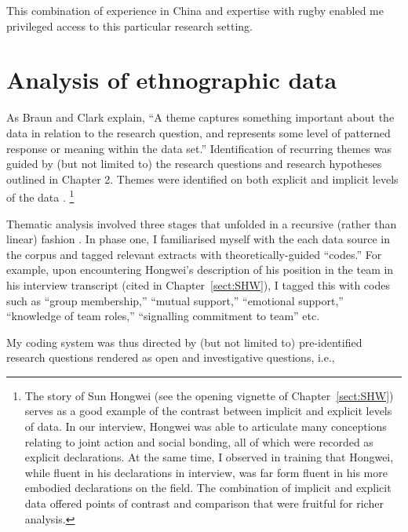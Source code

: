 \begin{CJK}{UTF8}{gbsn}
  This combination of experience in China and expertise with rugby enabled me privileged access to this particular research setting.



\section{Analysis of ethnographic data\label{app3:ethnoAnalysis}}
As Braun and Clark \textcite[10]{Braun2006} explain, ``A theme captures something important about the data in relation to the research question, and represents some level of patterned response or meaning within the data set.''  Identification of recurring themes was guided by (but not limited to) the research questions and research hypotheses outlined in Chapter 2.  Themes were identified on both explicit and implicit levels of the data \citep{Boyatzis1998}.  \footnote{The story of Sun Hongwei (see the opening vignette of Chapter~\ref{sect:SHW}) serves as a good example of the contrast between implicit and explicit levels of data.  In our interview, Hongwei was able to articulate many conceptions relating to joint action and social bonding, all of which were recorded as explicit declarations.  At the same time, I observed in training that Hongwei, while fluent in his declarations in interview, was far form fluent in his more embodied declarations on the field.  The combination of implicit and explicit data offered points of contrast and comparison that were fruitful for richer analysis.}

Thematic analysis involved three stages that unfolded in a recursive (rather than linear) fashion \citep{Braun2006}. In phase one, I familiarised myself with the each data source in the corpus and tagged relevant extracts with theoretically-guided ``codes.'' For example, upon encountering Hongwei's description of his position in the team in his interview transcript (cited in Chapter~\ref{sect:SHW}), I tagged this with codes such as ``group membership,'' ``mutual support,'' ``emotional support,'' ``knowledge of team roles,'' ``signalling commitment to team'' etc.

My coding system was thus directed by (but not limited to) pre-identified research questions rendered as open and investigative questions, i.e.,


\end{CJK}

